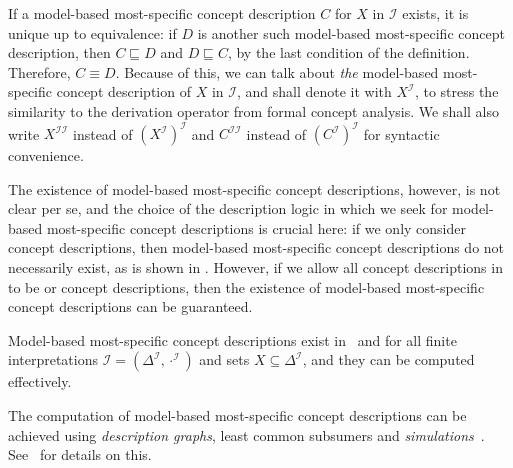 If a model-based most-specific concept description $C$ for $X$ in $\mathcal{I}$ exists, it
is unique up to equivalence: if $D$ is another such model-based most-specific concept
description, then $C \sqsubseteq D$ and $D \sqsubseteq C$, by the last condition of the
definition.  Therefore, $C \equiv D$.  Because of this, we can talk about \emph{the}
model-based most-specific concept description of $X$ in $\mathcal{I}$, and shall denote it
with $X^{\mathcal{I}}$, to stress the similarity to the derivation operator from formal
concept analysis.  We shall also write $X^{\mathcal{I}\mathcal{I}}$ instead of
$(X^{\mathcal{I}})^{\mathcal{I}}$ and $C^{\mathcal{I}\mathcal{I}}$ instead of
$(C^{\mathcal{I}})^{\mathcal{I}}$ for syntactic convenience.

The existence of model-based most-specific concept descriptions, however, is not clear per
se, and the choice of the description logic in which we seek for model-based most-specific
concept descriptions is crucial here: if we only consider \ELbot concept descriptions,
then model-based most-specific concept descriptions do not necessarily exist, as is shown
in .  However, if we allow all concept
descriptions in  to be \ELgfp or \ELgfpbot
concept descriptions, then the existence of model-based most-specific concept descriptions
can be guaranteed.

\begin{Theorem}
  \label{thm:existence-of-mmscs-in-ELgfpbot}
  Model-based most-specific concept descriptions exist in \ELgfp\ and \ELgfpbot for all
  finite interpretations $\mathcal{I} = (\Delta^{\mathcal{I}}, \cdot^{\mathcal{I}})$ and
  sets $X \subseteq \Delta^{\mathcal{I}}$, and they can be computed effectively.
\end{Theorem}

The computation of model-based most-specific concept descriptions can be achieved using
\emph{\EL description graphs}, least common subsumers and
\emph{simulations}~\cite{DBLP:conf/ijcai/Baader03a,Diss-Felix}.  See~\cite[Section
4.1.2]{Diss-Felix} for details on this.

